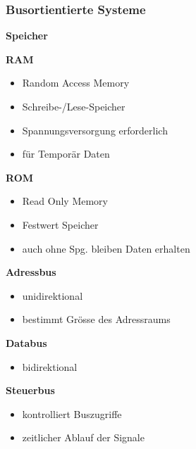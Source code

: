 \subsubsection{Busortientierte Systeme}
\textbf{Speicher}
\begin{multicols}{2}
    \textbf{RAM}
    \begin{itemize}
        \item Random Access Memory
        \item Schreibe-/Lese-Speicher
        \item Spannungsversorgung erforderlich
        \item für Temporär Daten
    \end{itemize}

    \textbf{ROM}
    \begin{itemize}
        \item Read Only Memory
        \item Festwert Speicher
        \item auch ohne Spg. bleiben Daten erhalten
    \end{itemize}
\end{multicols}

\begin{multicols}{3}
\begin{minipage}{4cm}
        \textbf{Adressbus}
    \begin{itemize}
        \item unidirektional
        \item bestimmt Grösse des Adressraums
    \end{itemize}
\end{minipage}

\begin{minipage}{4cm}
    \textbf{Databus}
    \begin{itemize}
        \item bidirektional
    \end{itemize}
\end{minipage}

\begin{minipage}{5cm}
    \textbf{Steuerbus}
    \begin{itemize}
        \item kontrolliert Buszugriffe
        \item zeitlicher Ablauf der Signale
    \end{itemize}
\end{minipage}
\end{multicols}

